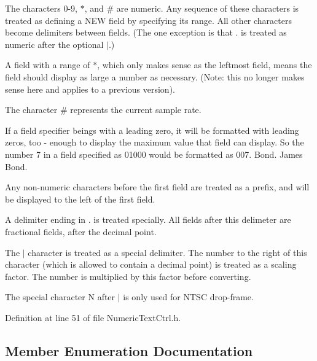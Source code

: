 \begin{DoxyItemize}
\item The characters \textquotesingle{}0-\/9\textquotesingle{}, \textquotesingle{}$\ast$\textquotesingle{}, and \textquotesingle{}\#\textquotesingle{} are numeric. Any sequence of these characters is treated as defining a N\+EW field by specifying its range. All other characters become delimiters between fields. (The one exception is that \textquotesingle{}.\textquotesingle{} is treated as numeric after the optional \textquotesingle{}$\vert$\textquotesingle{}.)
\item A field with a range of \textquotesingle{}$\ast$\textquotesingle{}, which only makes sense as the leftmost field, means the field should display as large a number as necessary. (Note\+: this no longer makes sense here and applies to a previous version).
\item The character \textquotesingle{}\#\textquotesingle{} represents the current sample rate.
\item If a field specifier beings with a leading zero, it will be formatted with leading zeros, too -\/ enough to display the maximum value that field can display. So the number 7 in a field specified as \textquotesingle{}01000\textquotesingle{} would be formatted as \textquotesingle{}007\textquotesingle{}. Bond. James Bond.
\item Any non-\/numeric characters before the first field are treated as a prefix, and will be displayed to the left of the first field.
\item A delimiter ending in \textquotesingle{}.\textquotesingle{} is treated specially. All fields after this delimeter are fractional fields, after the decimal point.
\item The \textquotesingle{}$\vert$\textquotesingle{} character is treated as a special delimiter. The number to the right of this character (which is allowed to contain a decimal point) is treated as a scaling factor. The number is multiplied by this factor before converting.
\item The special character \textquotesingle{}N\textquotesingle{} after \textquotesingle{}$\vert$\textquotesingle{} is only used for N\+T\+SC drop-\/frame. 
\end{DoxyItemize}

Definition at line 51 of file Numeric\+Text\+Ctrl.\+h.



\subsection{Member Enumeration Documentation}
